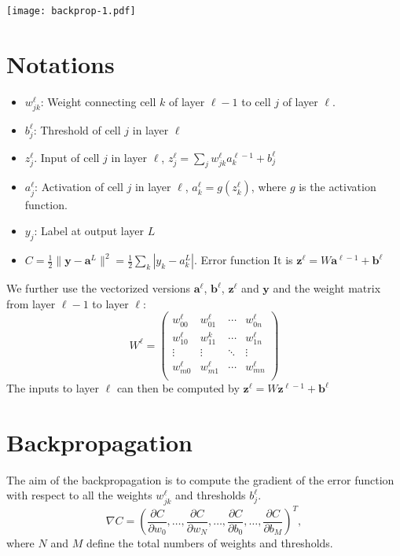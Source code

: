 \documentclass{article}
\newcommand{\vc}[1]{\boldsymbol{#1}}
\begin{document}
    \texttt{[image: backprop-1.pdf]}

    \def\inn{\text{in}}

    \section{Notations}

    \begin{itemize}
        \item $w_{jk}^\ell$: Weight connecting cell $k$ of layer $\ell -1$ to cell $j$ of layer $\ell$. 
        \item $b_j^\ell$: Threshold of cell $j$ in layer $\ell$
        \item $z_j^\ell$. Input of cell $j$ in layer $\ell$, $z_j^\ell = \sum_j w_{jk}^\ell a_k^{\ell-1} + b_j^\ell$  
        \item $a_j^\ell$: Activation of cell $j$ in layer $\ell$, $a_k^{\ell} = g(z_k^\ell)$, where $g$ is the activation function.
        \item $y_j$: Label at output layer $L$
        \item $C=\frac12 \| \vc{y} - \vc{a}^L \|^2 = \frac12 \sum_{k} | y_k - a_k^L |$. Error function 
        It is $\vc{z}^{\ell} = W\vc{a}^{\ell-1} + \vc{b}^\ell$
    \end{itemize}

    We further use the vectorized versions $\vc{a}^\ell$, $\vc{b}^\ell$, $\vc{z}^\ell$ and $\vc{y}$ and 
    the weight matrix from layer $\ell-1$ to layer $\ell$:
    \[
    W^\ell = 
    \begin{pmatrix}
        w_{00}^\ell & w_{01}^\ell & \cdots & w_{0n}^\ell \\
        w_{10}^\ell & w_{11}^k & \cdots & w_{1n}^\ell \\
        \vdots   & \vdots & \ddots & \vdots \\
        w_{m0}^\ell & w_{m1}^\ell & \cdots & w_{mn}^\ell \\ 
    \end{pmatrix}
    \]
    The inputs to layer $\ell$ can then be computed by $\vc{z}^\ell = W\vc{z}^{\ell-1}+\vc{b}^\ell$

    \section{Backpropagation}

    The aim of the backpropagation is to compute the gradient of the error function with 
    respect to all the weights $w_{jk}^\ell$ and thresholds $b_j^\ell$. 
    \[
      \nabla C = 
      \left(\frac{\partial C}{\partial w_0}, 
      \ldots,\frac{\partial C}{\partial w_N}, 
      \ldots,\frac{\partial C}{\partial b_0},
      \ldots,\frac{\partial C}{\partial b_M}
    \right)^T,
    \]
    where $N$ and $M$ define the total numbers of weights and thresholds.
\end{document}
